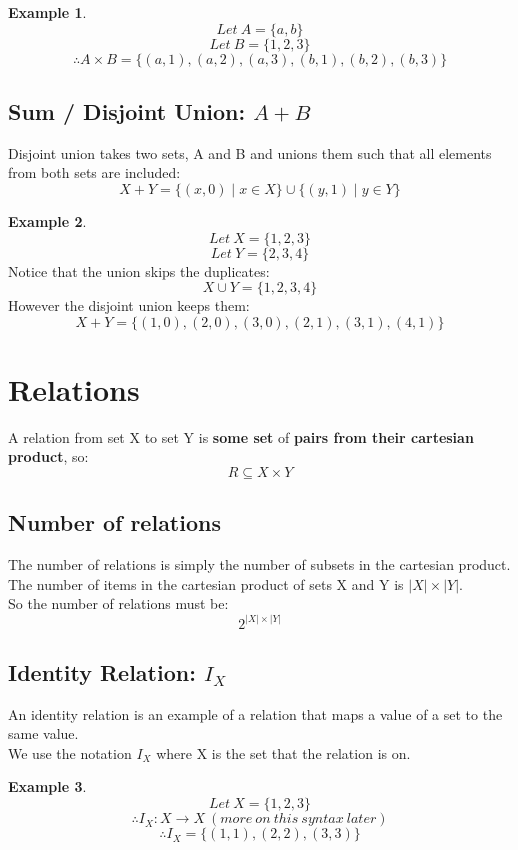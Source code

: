 \documentclass{article}
\theoremstyle{definition}
\newtheorem{ex}{Example}[section]
\begin{document}
\begin{ex}
	\[Let\ A = \{a,b\}\]
	\[Let\ B = \{1,2,3\}\]
	\[\therefore A \times B = \{(a,1), (a, 2), (a,3), (b,1), (b,2), (b,3)\}\]
	
	\begin{table}[H]
		\centering
		\begin{tabular}{c | c c c }
		$$ & 1 & 2 & 3\\
		\hline
		a & (a,1) & (a,2) & (a,3) \\
		b & (b,1) & (b,2) & (b,3)
	\end{tabular}
	\end{table}
\end{ex}


\subsection{Sum / Disjoint Union: $A + B$}
Disjoint union takes two sets, A and B and unions them such that all elements from both sets are included:
\[X + Y = \{(x,0) \mid x \in X\} \cup \{(y,1) \mid y \in Y\}\]

\begin{ex}
	\[Let\ X = \{1,2,3\}\]
	\[Let\ Y = \{2,3,4\}\]
	Notice that the union skips the duplicates:\[X\cup Y = \{1,2,3,4\}\] However the disjoint union keeps them: \[X + Y = \{(1,0), (2,0), (3,0), (2,1), (3,1), (4,1)\}\]
\end{ex}

\section{Relations}
A relation from set X to set Y is \textbf{some set} of \textbf{pairs from their cartesian product}, so:
\[R \subseteq X \times Y\]

\subsection{Number of relations}
The number of relations is simply the number of subsets in the cartesian product. \\
The number of items in the cartesian product of sets X and Y is $|X| \times |Y|$. \\
So the number of relations must be:
\[2^{|X|\times |Y|}\]


\subsection{Identity Relation: $I_X$}
An identity relation is an example of a relation that maps a value of a set to the same value.\\
We use the notation $I_X$ where X is the set that the relation is on.
\begin{ex}
	\[Let\ X = \{1,2,3\}\]
	\[\therefore I_X: X \rightarrow X\ (more\ on\ this\ syntax\ later)\]
	\[\therefore I_X = \{(1,1), (2,2), (3,3)\}\]
\end{ex}
\end{document}
